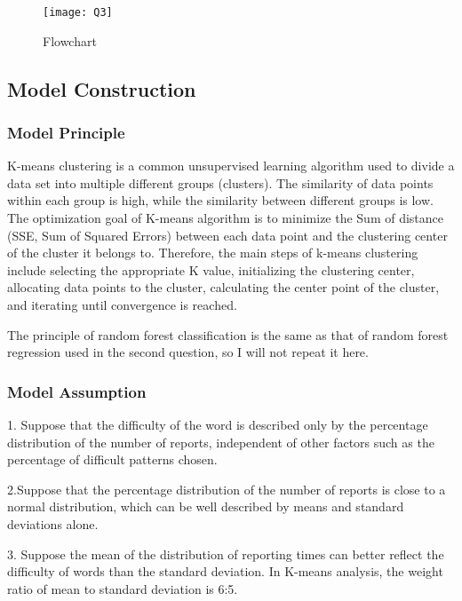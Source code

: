 \documentclass{mcmthesis}
\begin{document}
\begin{figure}[h]
\small
\centering
\texttt{[image: Q3]}
\caption{Flowchart} \label{fig:aa}
\end{figure}

\subsection{Model Construction}
\subsubsection{Model Principle}

\hspace*{0.6cm}K-means clustering is a common unsupervised learning algorithm used to divide a data set into multiple different groups (clusters). The similarity of data points within each
group is high, while the similarity between different groups is low. The optimization goal
of K-means algorithm is to minimize the Sum of distance (SSE, Sum of Squared Errors)
between each data point and the clustering center of the cluster it belongs to. Therefore,
the main steps of k-means clustering include selecting the appropriate K value, initializing
the clustering center, allocating data points to the cluster, calculating the center point of
the cluster, and iterating until convergence is reached.

The principle of random forest classification is the same as that of random forest
regression used in the second question, so I will not repeat it here.

\subsubsection{Model Assumption}

\hspace*{0.6cm}1. Suppose that the difficulty of the word is described only by the percentage
distribution of the number of reports, independent of other factors such as the
percentage of difficult patterns chosen.

2.Suppose that the percentage distribution of the number of reports is close to a
normal distribution, which can be well described by means and standard deviations
alone.

3. Suppose the mean of the distribution of reporting times can better reflect the
difficulty of words than the standard deviation. In K-means analysis, the weight ratio
of mean to standard deviation is 6:5.
\end{document}

